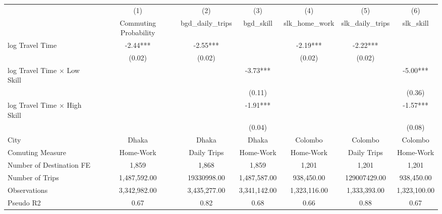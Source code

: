 {
\def\sym#1{\ifmmode^{#1}\else\(^{#1}\)\fi}
\begin{tabular}{l*{6}{c}}
\toprule
            &\multicolumn{1}{c}{(1)}&\multicolumn{1}{c}{(2)}&\multicolumn{1}{c}{(3)}&\multicolumn{1}{c}{(4)}&\multicolumn{1}{c}{(5)}&\multicolumn{1}{c}{(6)}\\
            &\multicolumn{1}{c}{Commuting Probability}&\multicolumn{1}{c}{bgd\_daily\_trips}&\multicolumn{1}{c}{bgd\_skill}&\multicolumn{1}{c}{slk\_home\_work}&\multicolumn{1}{c}{slk\_daily\_trips}&\multicolumn{1}{c}{slk\_skill}\\
\addlinespace\addlinespace
log Travel Time&       -2.44***&       -2.55***&               &       -2.19***&       -2.22***&               \\
            &      (0.02)   &      (0.02)   &               &      (0.02)   &      (0.02)   &               \\
\addlinespace
log Travel Time $\times$ Low Skill&               &               &       -3.73***&               &               &       -5.00***\\
            &               &               &      (0.11)   &               &               &      (0.36)   \\
\addlinespace
log Travel Time $\times$ High Skill&               &               &       -1.91***&               &               &       -1.57***\\
            &               &               &      (0.04)   &               &               &      (0.08)   \\
\addlinespace\addlinespace
City        &       Dhaka   &       Dhaka   &       Dhaka   &     Colombo   &     Colombo   &     Colombo   \\
Comuting Measure&   Home-Work   & Daily Trips   &   Home-Work   &   Home-Work   & Daily Trips   &   Home-Work   \\
Number of Destination FE&       1,859   &       1,868   &       1,859   &       1,201   &       1,201   &       1,201   \\
Number of Trips&1,487,592.00   & 19330998.00   &1,487,587.00   &  938,450.00   &129007429.00   &  938,450.00   \\
Observations&3,342,982.00   &3,435,277.00   &3,341,142.00   &1,323,116.00   &1,333,393.00   &1,323,100.00   \\
Pseudo R2   &        0.67   &        0.82   &        0.68   &        0.66   &        0.88   &        0.67   \\
\bottomrule
\end{tabular}
}
